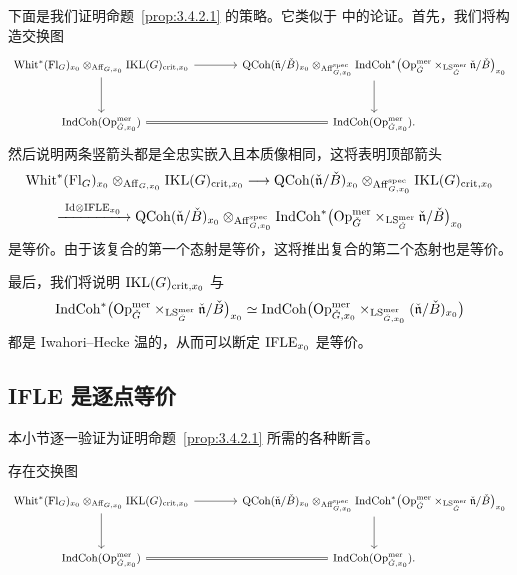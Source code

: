 下面是我们证明命题~\ref{prop:3.4.2.1} 的策略。它类似于 \cite[第 7.2 节至第 7.4
节]{ABC+24a} 中的论证。首先，我们将构造交换图
\[
\begin{tikzcd}[column sep=large,row sep=large,cells={font=\small}]
\Whit^{*}(\Fl_G)_{x_0}\otimes_{\Aff_{G,x_0}}\IKL(G)_{\crit,x_0}
\arrow[r] \arrow[d]
& \QCoh(\check{\mathfrak{n}}/\check B)_{x_0}
\otimes_{\Aff^{\spec}_{G,x_0}}
\IndCoh^{*}\bigl(\Op^{\mer}_{\check G}
\times_{\LS^{\mer}_{\check G}}\check{\mathfrak{n}}/\check B\bigr)_{x_0}
\arrow[d]\\
\IndCoh(\Op^{\mer}_{\check G,x_0}) \arrow[r,equal] &
\IndCoh(\Op^{\mer}_{\check G,x_0}).
\end{tikzcd}
\]
然后说明两条竖箭头都是全忠实嵌入且本质像相同，这将表明顶部箭头
\begin{equation}
\mathrm{Whit}^{*}(\mathrm{Fl}_G)_{x_0}\otimes_{\mathrm{Aff}_{G,x_0}}\mathrm{IKL}(G)_{\mathrm{crit},x_0}
\longrightarrow
\mathrm{QCoh}(\check{\mathfrak{n}}/\check B)_{x_0}
\otimes_{\mathrm{Aff}^{\mathrm{spec}}_{G,x_0}}\mathrm{IKL}(G)_{\mathrm{crit},x_0}
\label{eq:3.4.5}
\end{equation}
\begin{equation}
\xrightarrow{\ \mathrm{Id}\otimes \IFLE_{x_0}\ }
\QCoh(\check{\mathfrak{n}}/\check B)_{x_0}
\otimes_{\Aff^{\spec}_{G,x_0}}
\IndCoh^{*}\bigl(\Op^{\mer}_{\check G}
\times_{\LS^{\mer}_{\check G}}\check{\mathfrak{n}}/\check B\bigr)_{x_0}
\label{eq:3.4.6}
\end{equation}
是等价。由于该复合的第一个态射是等价，这将推出复合的第二个态射也是等价。

最后，我们将说明 $\mathrm{IKL}(G)_{\mathrm{crit},x_0}$ 与
\[
\mathrm{IndCoh}^{*}\bigl(\mathrm{Op}^{\mathrm{mer}}_{\check G}
\times_{\mathrm{LS}^{\mathrm{mer}}_{\check G}}\check{\mathfrak{n}}/\check B\bigr)_{x_0}
\simeq
\mathrm{IndCoh}\bigl(\mathrm{Op}^{\mathrm{mer}}_{\check G,x_0}
\times_{\mathrm{LS}^{\mathrm{mer}}_{\check G,x_0}}(\check{\mathfrak{n}}/\check B)_{x_0}\bigr)
\]
都是 Iwahori–Hecke 温的，从而可以断定 $\mathrm{IFLE}_{x_0}$ 是等价。

\subsection{IFLE 是逐点等价}
\label{sec:ifle-pointwise}

本小节逐一验证为证明命题~\ref{prop:3.4.2.1} 所需的各种断言。

\begin{proposition}\label{prop:3.4.4.1}
存在交换图
\[
\begin{tikzcd}[column sep=large,row sep=large,cells={font=\small}]
\Whit^{*}(\Fl_G)_{x_0}\otimes_{\Aff_{G,x_0}}\IKL(G)_{\crit,x_0}
\arrow[r] \arrow[d]
& \QCoh(\check{\mathfrak{n}}/\check B)_{x_0}
\otimes_{\Aff^{\spec}_{G,x_0}}
\IndCoh^{*}\bigl(\Op^{\mer}_{\check G}
\times_{\LS^{\mer}_{\check G}}\check{\mathfrak{n}}/\check B\bigr)_{x_0}
\arrow[d]\\
\IndCoh(\Op^{\mer}_{\check G,x_0}) \arrow[r,equal] &
\IndCoh(\Op^{\mer}_{\check G,x_0}).
\end{tikzcd}
\]
\end{proposition}

